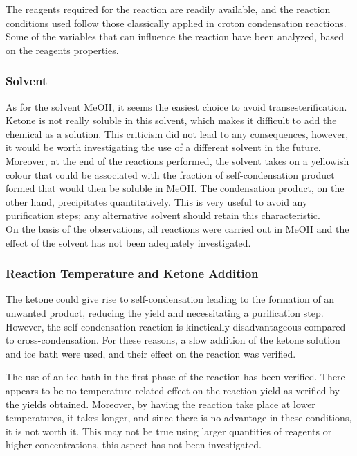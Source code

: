 \documentclass[../Master.tex]{subfiles}
\begin{document}
The reagents required for the reaction are readily available, and the reaction conditions used follow those classically applied in croton condensation reactions. Some of the variables that can influence the reaction have been analyzed, based on the reagents properties.\\

\subsubsection{Solvent}

As for the solvent MeOH, it seems the easiest choice to avoid transesterification.
Ketone is not really soluble in this solvent, which makes it difficult to add the chemical as a solution. This criticism did not lead to any consequences, however, it would be worth investigating the use of a different solvent in the future. Moreover, at the end of the reactions performed, the solvent takes on a yellowish colour that could be associated with the fraction of self-condensation product formed that would then be soluble in MeOH. The condensation product, on the other hand, precipitates quantitatively. This is very useful to avoid any purification steps; any alternative solvent should retain this characteristic.\\
On the basis of the observations, all reactions were carried out in MeOH and the effect of the solvent has not been adequately investigated.

\subsubsection{Reaction Temperature and Ketone Addition}

The ketone could give rise to self-condensation leading to the formation of an unwanted product, reducing the yield and necessitating a purification step. However, the self-condensation reaction is kinetically disadvantageous compared to cross-condensation. For these reasons, a slow addition of the ketone solution and ice bath were used, and their effect on the reaction was verified.

The use of an ice bath in the first phase of the reaction has been verified. There appears to be no temperature-related effect on the reaction yield as verified by the yields obtained. Moreover, by having the reaction take place at lower temperatures, it takes longer, and since there is no advantage in these conditions, it is not worth it. This may not be true using larger quantities of reagents or higher concentrations, this aspect has not been investigated.
\end{document}
